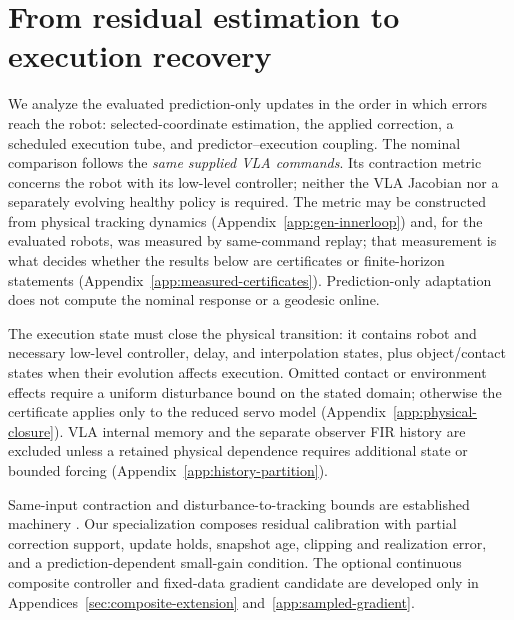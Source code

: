 \section{From residual estimation to execution recovery}
\label{sec:theory}\label{sec:contraction}
We analyze the evaluated prediction-only updates in the order in which
errors reach the robot: selected-coordinate estimation, the applied
correction, a scheduled execution tube, and predictor--execution coupling.
The nominal comparison follows the \emph{same supplied VLA commands}.
Its contraction metric concerns the robot with its low-level controller;
neither the VLA Jacobian nor a separately evolving healthy policy is required.
The metric may be constructed from physical tracking dynamics
(Appendix~\ref{app:gen-innerloop}) and, for the evaluated robots, was
measured by same-command replay; that measurement is what decides whether
the results below are certificates or finite-horizon statements
(Appendix~\ref{app:measured-certificates}). Prediction-only adaptation does
not compute the nominal response or a geodesic online.

The execution state must close the physical transition: it contains robot
and necessary low-level controller, delay, and interpolation states, plus
object/contact states when their evolution affects execution. Omitted contact
or environment effects require a uniform disturbance bound on the stated
domain; otherwise the certificate applies only to the reduced servo model
(Appendix~\ref{app:physical-closure}). VLA internal memory and the separate
observer FIR history are excluded unless a retained physical dependence
requires additional state or bounded forcing
(Appendix~\ref{app:history-partition}).

Same-input contraction and disturbance-to-tracking bounds are established
machinery \citep{lohmiller1998,manchester2017}. Our
specialization composes residual calibration with partial correction support,
update holds, snapshot age, clipping and realization error, and a
prediction-dependent small-gain condition. The optional continuous composite
controller and fixed-data gradient candidate are developed only in
Appendices~\ref{sec:composite-extension} and~\ref{app:sampled-gradient}.
